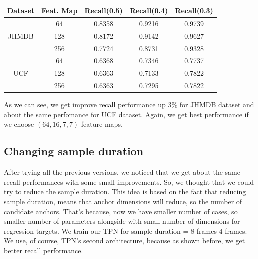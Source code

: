 \documentclass{report}
\begin{document}

\begin{table}[h]
  \centering
  \begin{tabular}{||c | c || c  c  c||}
    \hline
    \textbf{Dataset}  & \textbf{Feat. Map} & \textbf{Recall(0.5)} & \textbf{Recall(0.4)} & \textbf{Recall(0.3)}\\
    \hline
    \multirow{3}{*}{JHMDB} & 64 & 0.8358 & 0.9216 & 0.9739\\
    \cline{2-5}
    {} & 128 & 0.8172 & 0.9142 & 0.9627 \\
    \cline{2-5}
    {} & 256 & 0.7724 & 0.8731 & 0.9328 \\
    \hline
    \multirow{3}{*}{UCF} & 64 & 0.6368 & 0.7346 & 0.7737 \\ 
    \cline{2-5}
    {} & 128 & 0.6363 & 0.7133 & 0.7822 \\
    \cline{2-5}
    {} & 256 &  0.6363 & 0.7295 & 0.7822 \\
    \hline

  \end{tabular}
  \caption{}
  \label{table:reg_2_2}
\end{table}

As we can see, we get improve recall performance up 3\% for JHMDB dataset and about the same perfomance for UCF dataset. Again, we get best performance
if we choose $(64, 16, 7, 7)$ feature maps.

\subsection{Changing sample duration}
After trying all the previous versions, we noticed that we get about the same recall performances with some small improvements. So, we thought that we could try
to reduce the sample duration. This idea is based on the fact that reducing sample duration, means that anchor dimensions will reduce, so the number of
candidate anchors. That's because, now we have smaller number of cases, so smaller number of parameters alongside with small number of dimensions for regression targets.
We train our TPN for sample duration = 8 frames 4 frames. We use, of course, TPN's second  architecture, because as shown before, we get better recall performance.
\end{document}
